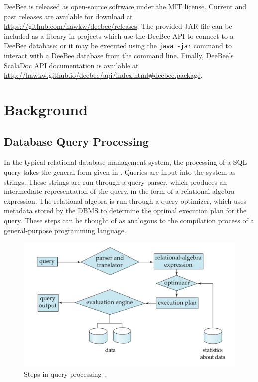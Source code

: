 DeeBee is released as open-source software under the MIT license. Current and past releases are available for download at \url{https://github.com/hawkw/deebee/releases}. The provided JAR file can be included as a library in projects which use the DeeBee API to connect to a DeeBee database; or it may be executed using the \texttt{java -jar} command to interact with a DeeBee database from the command line. Finally, DeeBee's ScalaDoc API documentation is available at \url{http://hawkw.github.io/deebee/api/index.html#deebee.package}.

\section{Background}
\subsection{Database Query Processing}

In the typical relational database management system, the processing of a SQL query takes the general form given in . Queries are input into the system as strings. These strings are run through a query parser, which produces an intermediate representation of the query, in the form of a relational algebra expression. The relational algebra is run through a query optimizer, which uses metadata stored by the DBMS to determine the optimal execution plan for the query. These steps can be thought of as analogous to the compilation process of a general-purpose programming language.

\begin{figure}[h]
	\centering
	\includegraphics[width=\textwidth]{QueryProcessing}
	\caption{Steps in query processing~\cite{silberschatz2010database}.}
	\label{fig:qp}
\end{figure}

